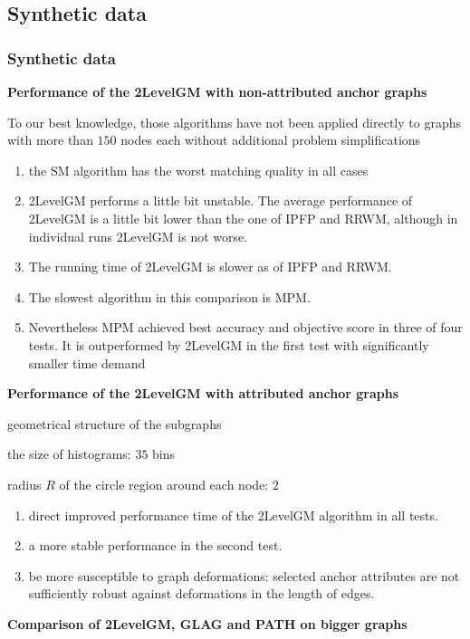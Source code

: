 \documentclass[handout]{beamer}
\begin{document}
\subsection{Synthetic data}
\begin{frame}[allowframebreaks]
\frametitle{Synthetic data}
\textbf{Performance of the 2LevelGM with non-attributed anchor graphs}

To our best knowledge, those algorithms have not been applied directly to graphs with more than $150$ nodes each without additional problem simplifications 

\begin{enumerate}
\item the SM algorithm has the worst matching quality in all cases

\item 2LevelGM performs a little bit unstable. The average performance of 2LevelGM is a little bit lower than the one of IPFP and RRWM, although in individual runs 2LevelGM is not worse.

\item The running time of 2LevelGM is slower as of IPFP and RRWM. 

\item The slowest algorithm in this comparison is MPM. 

\item Nevertheless MPM achieved  best accuracy and objective score in three of four tests. It is outperformed by 2LevelGM in the first test with significantly smaller time demand

\end{enumerate}

\framebreak

\textbf{Performance of the 2LevelGM with attributed anchor graphs}

geometrical structure of the subgraphs

the size of histograms: $35$ bins

radius $R$ of the circle region around each node: $2$

\begin{enumerate}
\item  direct improved performance time of the 2LevelGM algorithm in all tests.

\item a more stable performance in the second test. 

\item be more susceptible to graph deformations: selected anchor attributes are not sufficiently robust against deformations in the length of edges.
\end{enumerate}
\framebreak
{\small
\textbf{Comparison of 2LevelGM, GLAG and PATH on bigger graphs}

}
\end{frame}
\end{document}
